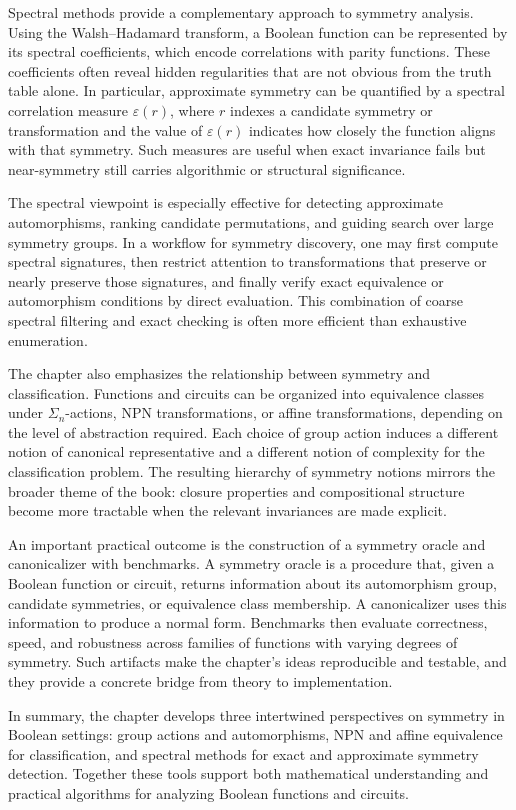 Spectral methods provide a complementary approach to symmetry analysis. Using the Walsh--Hadamard transform, a Boolean function can be represented by its spectral coefficients, which encode correlations with parity functions. These coefficients often reveal hidden regularities that are not obvious from the truth table alone. In particular, approximate symmetry can be quantified by a spectral correlation measure \(\varepsilon(r)\), where \(r\) indexes a candidate symmetry or transformation and the value of \(\varepsilon(r)\) indicates how closely the function aligns with that symmetry. Such measures are useful when exact invariance fails but near-symmetry still carries algorithmic or structural significance.

The spectral viewpoint is especially effective for detecting approximate automorphisms, ranking candidate permutations, and guiding search over large symmetry groups. In a workflow for symmetry discovery, one may first compute spectral signatures, then restrict attention to transformations that preserve or nearly preserve those signatures, and finally verify exact equivalence or automorphism conditions by direct evaluation. This combination of coarse spectral filtering and exact checking is often more efficient than exhaustive enumeration.

The chapter also emphasizes the relationship between symmetry and classification. Functions and circuits can be organized into equivalence classes under \(\Sigma_n\)-actions, NPN transformations, or affine transformations, depending on the level of abstraction required. Each choice of group action induces a different notion of canonical representative and a different notion of complexity for the classification problem. The resulting hierarchy of symmetry notions mirrors the broader theme of the book: closure properties and compositional structure become more tractable when the relevant invariances are made explicit.

An important practical outcome is the construction of a symmetry oracle and canonicalizer with benchmarks. A symmetry oracle is a procedure that, given a Boolean function or circuit, returns information about its automorphism group, candidate symmetries, or equivalence class membership. A canonicalizer uses this information to produce a normal form. Benchmarks then evaluate correctness, speed, and robustness across families of functions with varying degrees of symmetry. Such artifacts make the chapter's ideas reproducible and testable, and they provide a concrete bridge from theory to implementation.

In summary, the chapter develops three intertwined perspectives on symmetry in Boolean settings: group actions and automorphisms, NPN and affine equivalence for classification, and spectral methods for exact and approximate symmetry detection. Together these tools support both mathematical understanding and practical algorithms for analyzing Boolean functions and circuits.
